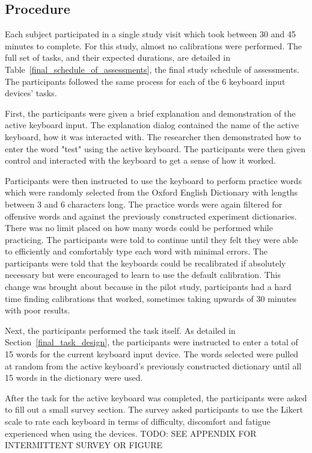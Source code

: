 \subsection{Procedure} \label{final_procedure}
Each subject participated in a single study visit which took between 30 and 45 minutes to complete. For this study, almost no calibrations were performed. The full set of tasks, and their expected durations, are detailed in Table~\ref{final_schedule_of_assessments}, the final study schedule of assessments. The participants followed the same process for each of the 6 keyboard input devices' tasks.

First, the participants were given a brief explanation and demonstration of the active keyboard input. The explanation dialog contained the name of the active keyboard, how it was interacted with. The researcher then demonstrated how to enter the word "test" using the active keyboard. The participants were then given control and interacted with the keyboard to get a sense of how it worked.

Participants were then instructed to use the keyboard to perform practice words which were randomly selected from the Oxford English Dictionary with lengths between 3 and 6 characters long. The practice words were again filtered for offensive words and against the previously constructed experiment dictionaries. There was no limit placed on how many words could be performed while practicing. The participants were told to continue until they felt they were able to efficiently and comfortably type each word with minimal errors. The participants were told that the keyboards could be recalibrated if absolutely necessary but were encouraged to learn to use the default calibration. This change was brought about because in the pilot study, participants had a hard time finding calibrations that worked, sometimes taking upwards of 30 minutes with poor results.

Next, the participants performed the task itself. As detailed in Section~\ref{final_task_design}, the participants were instructed to enter a total of 15 words for the current keyboard input device. The words selected were pulled at random from the active keyboard's previously constructed dictionary until all 15 words in the dictionary were used.

After the task for the active keyboard was completed, the participants were asked to fill out a small survey section. The survey asked participants to use the Likert scale to rate each keyboard in terms of difficulty, discomfort and fatigue experienced when using the devices. TODO: SEE APPENDIX FOR INTERMITTENT SURVEY OR FIGURE

